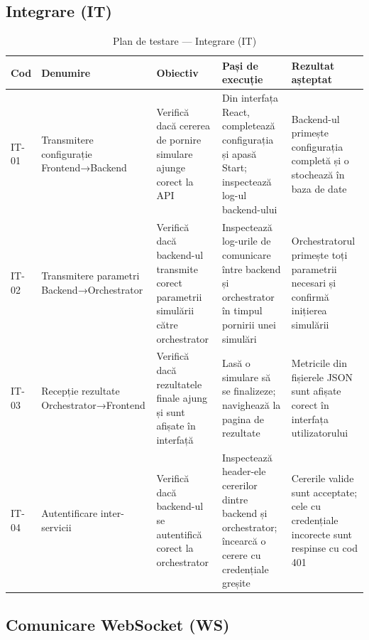 \documentclass[../../main.tex]{subfiles}
\begin{document}
    \subsection{Integrare (IT)}

    \begin{table}[H]
        \centering
        \footnotesize
        \begin{tabular}{|p{}|p{}|p{}|p{}|p{}|}
            \hline
            \textbf{Cod} & \textbf{Denumire} & \textbf{Obiectiv} & \textbf{Pași de execuție} & \textbf{Rezultat așteptat} \\
            \hline
            IT-01 & Transmitere configurație Frontend→Backend & Verifică dacă cererea de pornire simulare ajunge corect la API & Din interfața React, completează configurația și apasă Start; inspectează log-ul backend-ului & Backend-ul primește configurația completă și o stochează în baza de date \\
            \hline
            IT-02 & Transmitere parametri Backend→Orchestrator & Verifică dacă backend-ul transmite corect parametrii simulării către orchestrator & Inspectează log-urile de comunicare între backend și orchestrator în timpul pornirii unei simulări & Orchestratorul primește toți parametrii necesari și confirmă inițierea simulării \\
            \hline
            IT-03 & Recepție rezultate Orchestrator→Frontend & Verifică dacă rezultatele finale ajung și sunt afișate în interfață & Lasă o simulare să se finalizeze; navighează la pagina de rezultate & Metricile din fișierele JSON sunt afișate corect în interfața utilizatorului \\
            \hline
            IT-04 & Autentificare inter-servicii & Verifică dacă backend-ul se autentifică corect la orchestrator & Inspectează header-ele cererilor dintre backend și orchestrator; încearcă o cerere cu credențiale greșite & Cererile valide sunt acceptate; cele cu credențiale incorecte sunt respinse cu cod 401 \\
            \hline
        \end{tabular}
        \caption{Plan de testare --- Integrare (IT)}
        \label{tab:test_it}
    \end{table}

    \subsection{Comunicare WebSocket (WS)}
\end{document}
